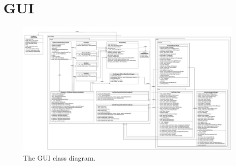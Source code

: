 

\section{GUI}
\begin{figure}[!ht]
\begin{center}
\includegraphics[width=1.0\linewidth]{./diagram_pictures/KlassendiagrammWidgets.pdf}
\caption{The GUI class diagram.}
\end{center}
\end{figure}

\newpage
